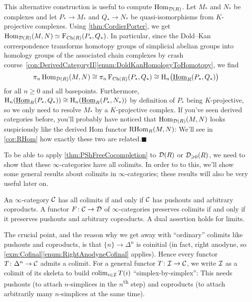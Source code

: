 \begin{numpar}
	This alternative construction is useful to compute $\operatorname{Hom}_{\mathcal{D}(R)}$. Let $M_*$ and $N_*$ be complexes and let $P_*\rightarrow M_*$ and $Q_*\rightarrow N_*$ be quasi-isomorphisms from $K$-projective complexes. Using \cref{thm:CordierPorter}, we get $\operatorname{Hom}_{\mathcal{D}(R)}(M,N)\simeq \operatorname{F}_{\operatorname{Ch}(R)}(P_*,Q_*)$. In particular, since the Dold--Kan correspondence transforms homotopy groups of simplicial abelian groups into homology groups of the associated chain complexes by crash course~\cref{con:DerivedCategoryII}\cref{enum:DoldKanHomologyToHomotopy}, we find
	\begin{equation*}
		\pi_n\operatorname{Hom}_{\mathcal{D}(R)}(M,N)\cong \pi_n\operatorname{F}_{\operatorname{Ch}(R)}(P_*,Q_*)\cong \mathrm{H}_n\bigl(\operatorname{\underline{Hom}}_R(P_*,Q_*)\bigr)
	\end{equation*}
	for all $n\geqslant 0$ and all basepoints. Furthermore, $\mathrm{H}_n(\operatorname{\underline{Hom}}_R(P_*,Q_*))\cong \mathrm{H}_n(\operatorname{\underline{Hom}}_R(P_*,N_*))$ by definition of $P_*$ being $K$-projective, so we only need to resolve $M_*$ by a $K$-projective complex. If you've seen derived categories before, you'll probably have noticed that $\operatorname{Hom}_{\mathcal{D}(R)}(M,N)$ looks suspiciously like the derived Hom functor $\operatorname{RHom}_R(M,N)$: We'll see in \cref{cor:RHom} how exactly these two are related.\hfill$\blacksquare$
\end{numpar}

To be able to apply \cref{thm:PShFreeCocompletion} to $\mathcal{D}(R)$ or $\mathcal{D}_{\geqslant 0}(R)$, we need to show that these $\infty$-categories have all colimits. In order to to this, we'll show some general results about colimits in $\infty$-categories; these results will also be very useful later on.

\begin{lem}\label{lem:ColimitsIffCoproductsAndPushouts}
	An $\infty$-category $\mathcal{C}$ has all colimits if and only if $\mathcal{C}$ has pushouts and arbitrary coproducts. A functor $F\colon \mathcal{C}\rightarrow\mathcal{D}$ of $\infty$-categories preserves colimits if and only if it preserves pushouts and arbitrary coproducts. A dual assertion holds for limits.
\end{lem}
The crucial point, and the reason why we get away with \enquote{ordinary} colimits like pushouts and coproducts, is that $\{n\}\rightarrow \Delta^n$ is coinitial (in fact, right anodyne, so \cref{exm:Cofinal}\cref{enum:RightAnodyneCofinal} applies). Hence every functor $T\colon \Delta^n\rightarrow \mathcal{C}$ admits a colimit. For a general functor $T\colon\mathcal{I}\rightarrow \mathcal{C}$, we write $\mathcal{I}$ as a colimit of its skeleta to build $\operatorname*{colim}_{i\in\mathcal{I}}T(i)$ \enquote{simplex-by-simplex}: This needs pushouts (to attach $n$-simplices in the $n$\textsuperscript{th} step) and coproducts (to attach arbitrarily many $n$-simplices at the same time). 

